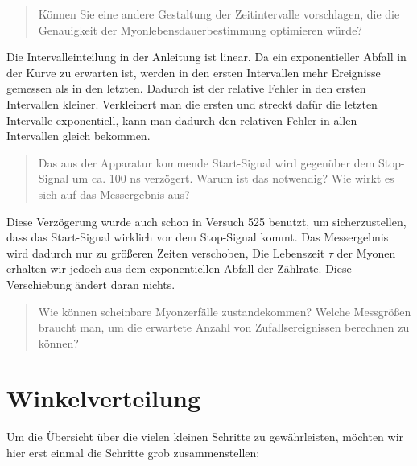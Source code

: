 \documentclass[11pt, ngerman, fleqn, DIV=15, headinclude, BCOR=2cm]{scrreprt}
\begin{document}

\begin{quote}
    Können Sie eine andere Gestaltung der Zeitintervalle vorschlagen, die die
    Genauigkeit der Myonlebensdauerbestimmung optimieren würde?
\end{quote}

Die Intervalleinteilung in der Anleitung ist linear. Da ein exponentieller
Abfall in der Kurve zu erwarten ist, werden in den ersten Intervallen mehr
Ereignisse gemessen als in den letzten. Dadurch ist der relative Fehler in den
ersten Intervallen kleiner. Verkleinert man die ersten und streckt dafür die
letzten Intervalle exponentiell, kann man dadurch den relativen Fehler in allen
Intervallen gleich bekommen.

\begin{quote}
    Das aus der Apparatur kommende Start-Signal wird gegenüber dem Stop-Signal
    um ca. 100 ns verzögert. Warum ist das notwendig? Wie wirkt es sich auf das
    Messergebnis aus?
\end{quote}

Diese Verzögerung wurde auch schon in Versuch 525 benutzt, um sicherzustellen,
dass das Start-Signal wirklich vor dem Stop-Signal kommt. Das Messergebnis wird
dadurch nur zu größeren Zeiten verschoben, Die Lebenszeit $\tau$ der Myonen
erhalten wir jedoch aus dem exponentiellen Abfall der Zählrate. Diese
Verschiebung ändert daran nichts.

\begin{quote}
    Wie können scheinbare Myonzerfälle zustandekommen? Welche Messgrößen
    braucht man, um die erwartete Anzahl von Zufallsereignissen berechnen zu
    können?
\end{quote}


\chapter{Winkelverteilung}

Um die Übersicht über die vielen kleinen Schritte zu gewährleisten, möchten wir
hier erst einmal die Schritte grob zusammenstellen:
\end{document}
